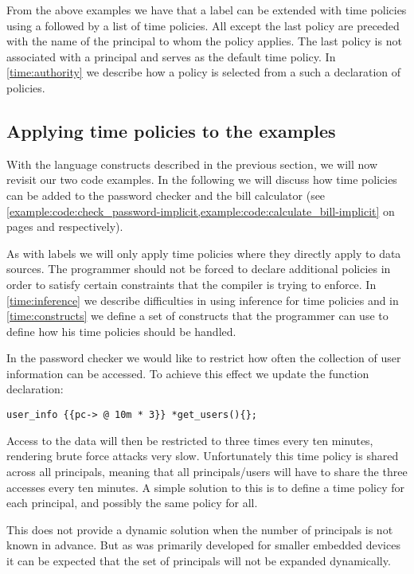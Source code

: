 From the above examples we have that a label can be extended with time policies using a  followed by a list of time policies.
All except the last policy are preceded with the name of the principal to whom the policy applies.
The last policy is not associated with a principal and serves as the default time policy.
In \cref{time:authority} we describe how a policy is selected from a such a declaration of policies.

\subsection{Applying time policies to the examples}\label{time:policy_examples}
With the language constructs described in the previous section, we will now revisit our two code examples.
In the following we will discuss how time policies can be added to the password checker and the bill calculator (see \cref{example:code:check_password-implicit,example:code:calculate_bill-implicit} on pages \pageref{example:code:check_password-implicit} and \pageref{example:code:calculate_bill-implicit} respectively).

As with labels we will only apply time policies where they directly apply to data sources.
The programmer should not be forced to declare additional policies in order to satisfy certain constraints that the compiler is trying to enforce.
In \cref{time:inference} we describe difficulties in using inference for time policies and in \cref{time:constructs} we define a set of constructs that the programmer can use to define how his time policies should be handled.

In the password checker we would like to restrict how often the collection of user information  can be accessed.
To achieve this effect we update the function declaration:

\begin{lstlisting}[style=dlmc]
  user_info {{pc-> @ 10m * 3}} *get_users(){};
\end{lstlisting}

Access to the data will then be restricted to three times every ten minutes, rendering brute force attacks very slow.
Unfortunately this time policy is shared across all principals, meaning that all principals/users will have to share the three accesses every ten minutes.
A simple solution to this is to define a time policy for each principal, and possibly the same policy for all.

This does not provide a dynamic solution when the number of principals is not known in advance.
But as \thelang{} was primarily developed for smaller embedded devices it can be expected that the set of principals will not be expanded dynamically.

